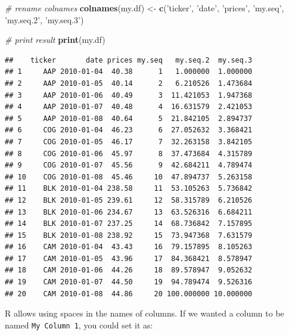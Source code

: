 \documentclass[11pt,]{book}
\newenvironment{Shaded}{\begin{snugshade}}{\end{snugshade}}
\newcommand{\KeywordTok}[1]{\textcolor[rgb]{0.27,0.27,0.27}{\textbf{#1}}}
\newcommand{\StringTok}[1]{\textcolor[rgb]{0.5,0.5,0.5}{#1}}
\newcommand{\CommentTok}[1]{\textcolor[rgb]{0.56,0.35,0.01}{\textit{#1}}}
\newcommand{\NormalTok}[1]{#1}
\begin{document}
\begin{Shaded}
\begin{Highlighting}[]
\CommentTok{# rename colnames}
\KeywordTok{colnames}\NormalTok{(my.df) <-}\StringTok{ }\KeywordTok{c}\NormalTok{(}\StringTok{'ticker'}\NormalTok{, }\StringTok{'date'}\NormalTok{, }\StringTok{'prices'}\NormalTok{, }
                     \StringTok{'my.seq'}\NormalTok{, }\StringTok{'my.seq.2'}\NormalTok{, }\StringTok{'my.seq.3'}\NormalTok{)}

\CommentTok{# print result}
\KeywordTok{print}\NormalTok{(my.df)}
\end{Highlighting}
\end{Shaded}

\begin{verbatim}
##    ticker       date prices my.seq   my.seq.2  my.seq.3
## 1     AAP 2010-01-04  40.38      1   1.000000  1.000000
## 2     AAP 2010-01-05  40.14      2   6.210526  1.473684
## 3     AAP 2010-01-06  40.49      3  11.421053  1.947368
## 4     AAP 2010-01-07  40.48      4  16.631579  2.421053
## 5     AAP 2010-01-08  40.64      5  21.842105  2.894737
## 6     COG 2010-01-04  46.23      6  27.052632  3.368421
## 7     COG 2010-01-05  46.17      7  32.263158  3.842105
## 8     COG 2010-01-06  45.97      8  37.473684  4.315789
## 9     COG 2010-01-07  45.56      9  42.684211  4.789474
## 10    COG 2010-01-08  45.46     10  47.894737  5.263158
## 11    BLK 2010-01-04 238.58     11  53.105263  5.736842
## 12    BLK 2010-01-05 239.61     12  58.315789  6.210526
## 13    BLK 2010-01-06 234.67     13  63.526316  6.684211
## 14    BLK 2010-01-07 237.25     14  68.736842  7.157895
## 15    BLK 2010-01-08 238.92     15  73.947368  7.631579
## 16    CAM 2010-01-04  43.43     16  79.157895  8.105263
## 17    CAM 2010-01-05  43.96     17  84.368421  8.578947
## 18    CAM 2010-01-06  44.26     18  89.578947  9.052632
## 19    CAM 2010-01-07  44.50     19  94.789474  9.526316
## 20    CAM 2010-01-08  44.86     20 100.000000 10.000000
\end{verbatim}

R allows using spaces in the names of columns. If we wanted a column to
be named \texttt{My\ Column\ 1}, you could set it as:
\end{document}
